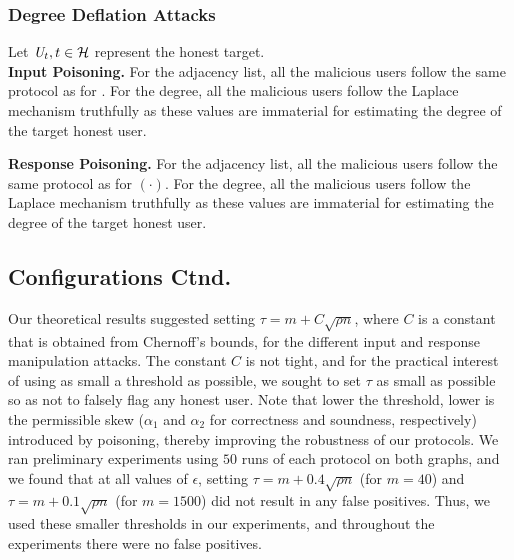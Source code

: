 \subsubsection{Degree Deflation Attacks}
Let $\textit{U}_t, t \in \mathcal{H}$ represent the honest target.\\
\noindent\textbf{Input Poisoning.}
For the adjacency list, all the malicious users follow the same protocol as for \DegRRCheck{}. For the degree, all the malicious users follow the Laplace mechanism truthfully as these values are immaterial for estimating the degree of the target honest user.
  
\noindent\textbf{Response Poisoning.} 
For the adjacency list, all the malicious users follow the same protocol as for \DegRRCheck$(\cdot)$. For the degree, all the malicious users follow the Laplace mechanism truthfully as these values are immaterial for estimating the degree of the target honest user.

\subsection{Configurations Ctnd.}
Our theoretical results suggested setting $\tau = m + C\sqrt{\rho n}$, where $C$ is a constant that is obtained from Chernoff's bounds, for the different input and response manipulation attacks. The constant $C$ is not tight, and for the practical interest of using as small a threshold as possible, we sought to set $\tau$ as small as possible so as not to falsely flag any honest user. Note that lower the threshold, lower is the permissible skew ($\alpha_1$ and $\alpha_2$  for correctness  and  soundness, respectively) introduced by poisoning, thereby improving the robustness of our protocols. We ran preliminary experiments using $50$ runs of each protocol on both graphs, and we found that at all values of $\epsilon$, setting $\tau = m + 0.4\sqrt{\rho n}$ (for $m = 40$) and $\tau = m + 0.1 \sqrt{\rho n}$ (for $m = 1500$) did not result in any false positives. Thus, we used these smaller thresholds in our experiments, and throughout the experiments there were no false positives.
